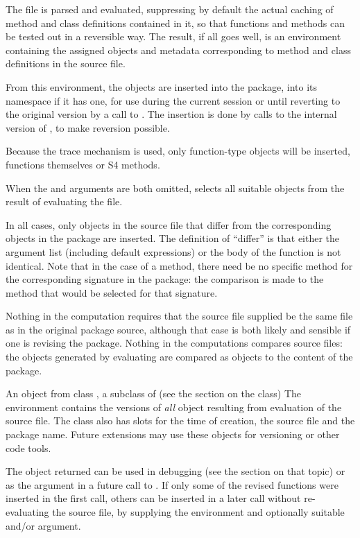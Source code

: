%
\begin{Details}\relax
The  file is parsed and evaluated, suppressing by default
the actual caching of method and class definitions contained in it, so
that functions and methods can be tested out in a reversible way.
The result, if all goes well, is an environment containing the
assigned objects and metadata corresponding to method and class definitions
in the source file.

From this environment, the objects are inserted into the package, into
its namespace if it has one, for use during the current session or
until reverting to the original version by a call to
.
The insertion is done by calls to the internal version of
, to make reversion possible.

Because the trace mechanism is used, only function-type objects will
be inserted, functions themselves or S4 methods.

When the  and  arguments are both
omitted,  selects all suitable objects from the
result of evaluating the  file.

In all cases,
only objects in the source file that differ from
the corresponding objects in the package are inserted.
The definition of ``differ'' is that either the argument list
(including default expressions) or the body of the function is not
identical.
Note that in the case of a method, there need be no specific method
for the corresponding signature in the package: the comparison is made
to the method that would be selected for that signature.

Nothing in the computation requires that the source file supplied be
the same file as in the original package source, although that case is
both likely and sensible if one is revising the package.  Nothing in
the computations compares source files:  the objects generated by
evaluating  are compared as objects to the content of the package.
\end{Details}
%
\begin{Value}
An object from class , a subclass of
 (see the section on the class)
The environment contains the versions
of \emph{all}  object resulting from evaluation of the source file.
The class also has slots for the time of creation, the source file
and the package name.
Future extensions may use these objects for versioning or other code tools.


The object returned can be used in debugging (see the section on that
topic) or as the 
argument in a future call to .  If only some of the
revised functions were inserted in the first call, others can be
inserted in a later call without re-evaluating the source file, by
supplying the environment and optionally suitable 
and/or  argument.
\end{Value}
